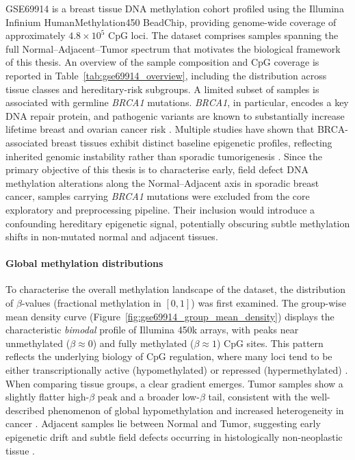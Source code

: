 GSE69914 is a breast tissue DNA methylation cohort profiled using the Illumina Infinium HumanMethylation450 BeadChip, providing genome-wide coverage of approximately $4.8\times10^5$ CpG loci. The dataset comprises samples spanning the full Normal--Adjacent--Tumor spectrum that motivates the biological framework of this thesis.
An overview of the sample composition and CpG coverage is reported in Table~\ref{tab:gse69914_overview}, including the distribution across tissue classes and hereditary-risk subgroups.
A limited subset of samples is associated with germline \textit{BRCA1} mutations. \textit{BRCA1}, in particular, encodes a key DNA repair protein, and pathogenic variants are known to substantially increase lifetime breast and ovarian cancer risk \cite{brca_factsheet}. Multiple studies have shown that BRCA-associated breast tissues exhibit distinct baseline epigenetic profiles, reflecting inherited genomic instability rather than sporadic tumorigenesis \cite{Suijkerbuijk2008, Bartlett2022}.
Since the primary objective of this thesis is to characterise early, field defect DNA methylation alterations along the Normal--Adjacent axis in sporadic breast cancer, samples carrying \textit{BRCA1} mutations were excluded from the core exploratory and preprocessing pipeline. Their inclusion would introduce a confounding hereditary epigenetic signal, potentially obscuring subtle methylation shifts in non-mutated normal and adjacent tissues.





\paragraph{Global methylation distributions}
\label{par:gse69914_global_meth}

To characterise the overall methylation landscape of the dataset, the distribution of $\beta$-values
(fractional methylation in $[0,1]$) was first examined.
The group-wise mean density curve (Figure~\ref{fig:gse69914_group_mean_density}) displays the
characteristic \emph{bimodal} profile of Illumina 450k arrays, with peaks near unmethylated
($\beta \approx 0$) and fully methylated ($\beta \approx 1$) CpG sites. This pattern reflects
the underlying biology of CpG regulation, where many loci tend to be either transcriptionally
active (hypomethylated) or repressed (hypermethylated) \cite{bird2002, maksimovic2012}.
When comparing tissue groups, a clear gradient emerges.
Tumor samples show a slightly flatter high-$\beta$ peak and a broader low-$\beta$ tail,
consistent with the well-described phenomenon of global hypomethylation and increased
heterogeneity in cancer \cite{ehrlich2002}. Adjacent samples lie between Normal and
Tumor, suggesting early epigenetic drift and subtle field defects occurring in histologically
non-neoplastic tissue \cite{Teschendorff2016fielddefects}.

